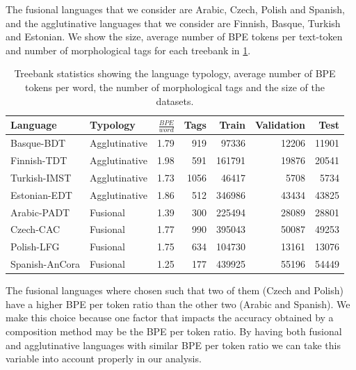 \documentclass[11pt]{article}
\newcommand\jp[1]{(\textbf{JP:} #1)}
\begin{document}
    
           	The fusional languages that we consider are Arabic, Czech,
     Polish and Spanish, and the agglutinative languages that we
     consider are Finnish, Basque, Turkish and Estonian.  We show the
     size, average number of BPE tokens per text-token and number of
     morphological tags for each treebank in \cref{tab:data}.
    

    
    
    	\begin{table} %
		\centering
		\begin{tabular}{l|lrrrrr}
			Language & Typology & $\frac{BPE}{word}$ & Tags & Train & Validation & Test \\
			\hline
			Basque-BDT      & Agglutinative & 1.79 & 919 & 97336 & 12206 & 11901 \\
			Finnish-TDT     & Agglutinative & 1.98 & 591 & 161791 & 19876 & 20541 \\
			Turkish-IMST    & Agglutinative & 1.73 & 1056 & 46417 & 5708 & 5734 \\
			Estonian-EDT    & Agglutinative & 1.86 & 512 & 346986 & 43434 & 43825 \\
            Arabic-PADT     & Fusional & 1.39 & 300 & 225494 & 28089 & 28801  \\
			Czech-CAC       & Fusional & 1.77 & 990 & 395043 & 50087 & 49253 \\
			Polish-LFG      & Fusional & 1.75 & 634 & 104730 & 13161 & 13076 \\
			Spanish-AnCora  & Fusional & 1.25 & 177 & 439925 & 55196 & 54449 \\
        \end{tabular}
		\caption{\label{tab:data} Treebank statistics showing the language typology, average number of BPE tokens per word, the number of morphological tags and the size of the datasets.}
	\end{table}
    
        The fusional languages where chosen such that two of them
        (Czech and Polish) have a higher BPE per token ratio than the
        other two (Arabic and Spanish). We make this choice because
        one factor that impacts the accuracy obtained by a composition
        method may be the BPE per token ratio.  By having both
        fusional and agglutinative languages with similar BPE per
        token ratio we can take this variable into account properly in
        our analysis.
\end{document}
